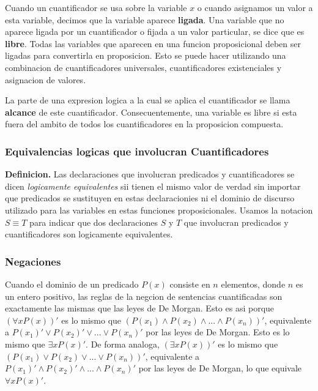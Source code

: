 \documentclass[]{article}
\begin{document}
Cuando un cuantificador se usa sobre la variable $x$ o cuando asignamos un valor a esta variable, decimos que la variable aparece \textbf{ligada}. Una variable que no aparece ligada por un cuantificador o fijada a un valor particular, se dice que es \textbf{libre}. Todas las variables que aparecen en una funcion proposicional deben ser ligadas para convertirla en proposicion. Esto se puede hacer utilizando una combinacion de cuantificadores universales, cuantificadores existenciales y asignacion de valores.

La parte de una expresion logica a la cual se aplica el cuantificador se llama \textbf{alcance} de este cuantificador. Consecuentemente, una variable es libre si esta fuera del ambito de todos los cuantificadores en la proposicion compuesta.

\subsubsection*{Equivalencias logicas que involucran Cuantificadores}

\textbf{Definicion.} Las declaraciones que involucran predicados y cuantificadores se dicen \textit{logicamente equivalentes} sii tienen el mismo valor de verdad sin importar que predicados se sustituyen en estas declaracionies ni el dominio de discurso utilizado para las variables en estas funciones proposicionales. Usamos la notacion $S \equiv T$ para indicar que dos declaraciones $S$ y $T$ que involucran predicados y cuantificadores son logicamente equivalentes.

\subsubsection*{Negaciones}

Cuando el dominio de un predicado $P(x)$ consiste en $n$ elementos, donde $n$ es un entero positivo, las reglas de la negcion de sentencias cuantificadas son exactamente las mismas que las leyes de De Morgan. Esto es asi porque $(\forall x P(x))'$ es lo mismo que $(P(x_{1}) \wedge P(x_{2}) \wedge ... \wedge P(x_{n}))'$, equivalente a $P(x_{1})' \vee P(x_{2})' \vee ... \vee P(x_{n})'$ por las leyes de De Morgan. Esto es lo mismo que $\exists x P(x)'$. De forma analoga,  $(\exists x P(x))'$ es lo mismo que $(P(x_{1}) \vee P(x_{2}) \vee ... \vee P(x_{n}))'$, equivalente a $P(x_{1})' \wedge P(x_{2})' \wedge ... \wedge P(x_{n})'$ por las leyes de De Morgan, lo que equivale  $\forall x P(x)'$.
\end{document}

